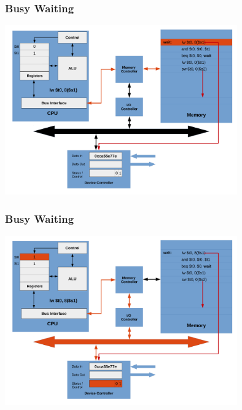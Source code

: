 \documentclass{beamer}
\begin{document}
\begin{frame}%
\frametitle{Busy Waiting}

\vspace*{-0.2cm}
\begin{center}
\hspace*{-1cm}\includegraphics[width=10cm]{busy_waiting11.pdf}
\end{center}

\end{frame}

\begin{frame}%
\frametitle{Busy Waiting}

\vspace*{-0.2cm}
\begin{center}
\hspace*{-1cm}\includegraphics[width=10cm]{busy_waiting12.pdf}
\end{center}

\end{frame}
\end{document}

